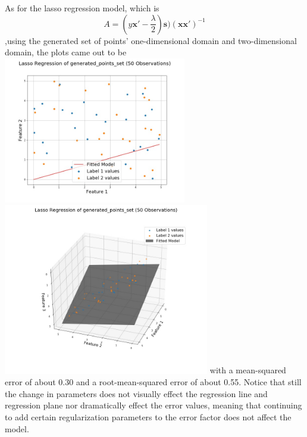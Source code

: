 \documentclass[a4paper,12pt]{IEEEtran}
\begin{document}
As for the lasso regression model, which is $$\textit{A} = (\textit{y}\textbf{x}' - \frac{\lambda}{2})\textbf{s})(\textbf{x}\textbf{x}')^{-1}$$,using the generated set of points' one-dimensional domain and two-dimensional domain, the plots came out to be \includegraphics[width=8cm]{lasso_reg_1d_generated_points_set} \includegraphics[width=9cm]{lasso_reg_2d_generated_points_set} with a mean-squared error of about 0.30 and a root-mean-squared error of about 0.55. Notice that still the change in parameters does not visually effect the regression line and regression plane nor dramatically effect the error values, meaning that continuing to add certain regularization parameters to the error factor does not affect the model.
\end{document}
